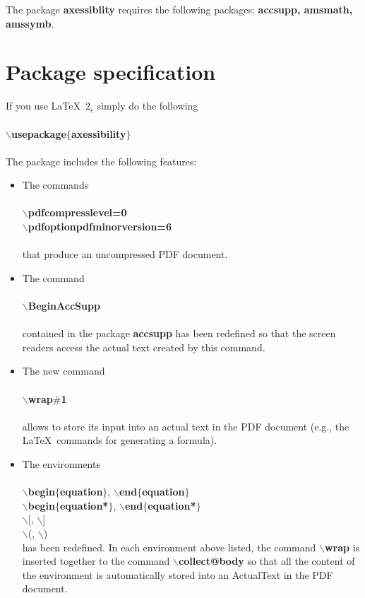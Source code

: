 \documentclass[11pt,a4paper]{article}
\begin{document}
The package \textbf{axessiblity} requires the following packages: \textbf{accsupp, amsmath, amssymb}.

\section{Package specification}

If you use \LaTeX\ $2_\epsilon$ simply do the following \\ \\
\indent $\backslash$\textbf{usepackage}$\{$\textbf{axessibility}$\}$
\\ \\
The package includes the following features:
\begin{itemize}
\item The commands \\ \\
\indent $\backslash$\textbf{pdfcompresslevel=0} \\
\indent $\backslash$\textbf{pdfoptionpdfminorversion=6} \\ \\
that produce an uncompressed PDF document. 
\item The command \\ \\
\indent $\backslash$\textbf{BeginAccSupp} 
\\ \\
contained in the package \textbf{accsupp} has been redefined so that the screen readers access the actual text created by this command. 
\item The new command \\ \\
\indent $\backslash$\textbf{wrap$\#$1}
\\ \\
allows to store its input into an actual text in the PDF document (e.g., the \LaTeX\ commands for generating a formula).

\item The environments \\ \\
\indent $\backslash$\textbf{begin}$\{$\textbf{equation}$\}$, $\backslash$\textbf{end}$\{$\textbf{equation}$\}$ \\
\indent $\backslash$\textbf{begin}$\{$\textbf{equation*}$\}$, $\backslash$\textbf{end}$\{$\textbf{equation*}$\}$ \\
\indent $\backslash$[, $\backslash$]\\
\indent $\backslash$(, $\backslash$)\\ %

has been redefined. In each environment above listed, the command $\backslash$\textbf{wrap} is inserted together to the command $\backslash$\textbf{collect@body} so that all the content of the environment is automatically stored into an ActualText in the PDF document.
\end{itemize}
\end{document}
